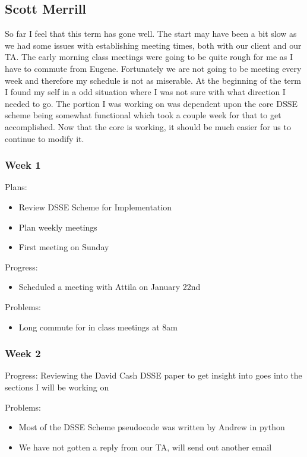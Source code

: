 \documentclass[onecolumn, draftclsnofoot,10pt, compsoc]{IEEEtran}
\begin{document}
\subsection{Scott Merrill}
So far I feel that this term has gone well. The start may have been a bit slow as we had some issues with establishing meeting times, both with our client and our TA. The early morning class meetings were going to be quite rough for me as I have to commute from Eugene. Fortunately we are not going to be meeting every week and therefore my schedule is not as miserable. At the beginning of the term I found my self in a odd situation where I was not sure with what direction I needed to go. The portion I was working on was dependent upon the core DSSE scheme being somewhat functional which took a couple week for that to get accomplished. Now that the core is working, it should be much easier for us to continue to modify it. 

\subsubsection{Week 1} 

Plans:
\begin{itemize}
\item Review DSSE Scheme for Implementation
\item Plan weekly meetings 
\item First meeting on Sunday
\end{itemize}

\noindent Progress:
\begin{itemize}
\item Scheduled a meeting with Attila on January 22nd
\end{itemize}

\noindent Problems: 
\begin{itemize}
\item Long commute for in class meetings at 8am
\end{itemize}
 

\subsubsection{Week 2}

Progress: Reviewing the David Cash DSSE paper to get insight into goes into the sections I will be working on

Problems:
\begin{itemize}
  \item Most of the DSSE Scheme pseudocode was written by Andrew in python 
  \item We have not gotten a reply from our TA, will send out another email
\end{itemize}
\end{document}
